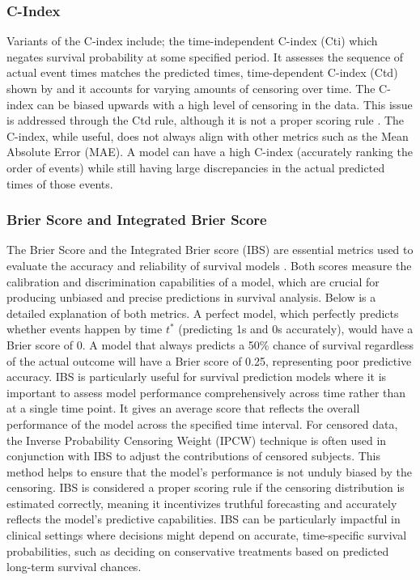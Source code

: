 \subsubsection{C-Index}
\noindent Variants of the C-index include; the time-independent C-index (Cti) which negates survival probability at some specified period. It assesses the sequence of actual event times matches the predicted times, time-dependent C-index (Ctd) shown by \parencite{qi_effective_2023} and it accounts for varying amounts of censoring over time. The C-index can be biased upwards with a high level of censoring in the data. This issue is addressed through the Ctd rule, although it is not a proper scoring rule \parencite{qi_effective_2023}. The C-index, while useful, does not always align with other metrics such as the Mean Absolute Error (MAE). A model can have a high C-index (accurately ranking the order of events) while still having large discrepancies in the actual predicted times of those events.

\subsubsection{Brier Score and Integrated Brier Score}
The Brier Score and the Integrated Brier score (IBS) are essential metrics used to evaluate the accuracy and reliability of survival models \parencite{haider_effective_2018}. Both scores measure the calibration and discrimination capabilities of a model, which are crucial for producing unbiased and precise predictions in survival analysis. Below is a detailed explanation of both metrics. A perfect model, which perfectly predicts whether events happen by time \(t^{*}\) (predicting 1s and 0s accurately), would have a Brier score of 0. A model that always predicts a 50\% chance of survival regardless of the actual outcome will have a Brier score of 0.25, representing poor predictive accuracy. IBS is particularly useful for survival prediction models where it is important to assess model performance comprehensively across time rather than at a single time point. It gives an average score that reflects the overall performance of the model across the specified time interval. For censored data, the Inverse Probability Censoring Weight (IPCW) \parencite{haider_effective_2018} technique is often used in conjunction with IBS to adjust the contributions of censored subjects. This method helps to ensure that the model's performance is not unduly biased by the censoring. IBS is considered a proper scoring rule if the censoring distribution is estimated correctly, meaning it incentivizes truthful forecasting and accurately reflects the model's predictive capabilities. IBS can be particularly impactful in clinical settings where decisions might depend on accurate, time-specific survival probabilities, such as deciding on conservative treatments based on predicted long-term survival chances.


